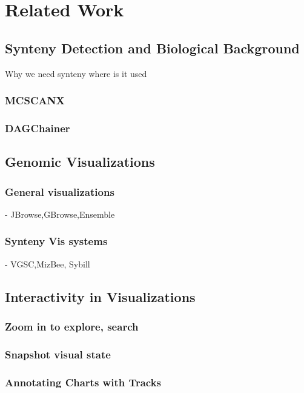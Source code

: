 \chapter{Related Work}


\section{Synteny Detection and Biological Background}
Why we need synteny where is it used
\subsection{MCSCANX}
\subsection{DAGChainer}

\section{Genomic Visualizations} 
\subsection{General visualizations} - JBrowse,GBrowse,Ensemble
\subsection{Synteny Vis systems} - VGSC,MizBee, Sybill

\section{Interactivity in Visualizations}
\subsection{Zoom in to explore, search}
\subsection{Snapshot visual state}
\subsection{Annotating Charts with Tracks}

